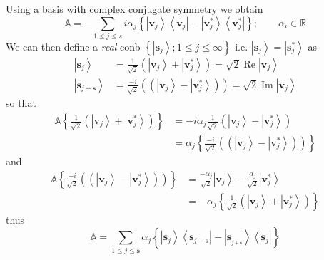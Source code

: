 \documentclass[aps,preprint]{revtex4}%
\begin{document}
Using a basis with complex conjugate symmetry we obtain
\begin{equation}
\mathbb{A}=-\sum_{1\leq j\leq s}i\alpha_{j}\left\{  \left\vert \mathbf{v}%
_{j}\right\rangle \left\langle \mathbf{v}_{j}\right\vert -\left\vert
\mathbf{v}_{j}^{\ast}\right\rangle \left\langle \mathbf{v}_{j}^{\ast
}\right\vert \right\}  ;\qquad\alpha_{i}\in\mathbb{R}%
\end{equation}
We can then define a \emph{real} conb $\left\{  \left\vert \mathbf{s}%
_{j}\right\rangle ;1\leq j\leq\infty\right\}  $ i.e. $\left\vert
\mathbf{s}_{j}\right\rangle =\left\vert \mathbf{s}_{j}^{\ast}\right\rangle $
as
\begin{align}
\left\vert \mathbf{s}_{j}\right\rangle  &  =\frac{1}{\sqrt{2}}\left(
\left\vert \mathbf{v}_{j}\right\rangle +\left\vert \mathbf{v}_{j}^{\ast
}\right\rangle \right)  =\sqrt{2}\operatorname{Re}\left\vert \mathbf{v}%
_{j}\right\rangle \nonumber\\
\left\vert \mathbf{s}_{j+\mathbf{s}}\right\rangle  &  =\frac{-i}{\sqrt{2}%
}\left(  \left(  \left\vert \mathbf{v}_{j}\right\rangle -\left\vert
\mathbf{v}_{j}^{\ast}\right\rangle \right)  \right)  =\sqrt{2}%
\operatorname{Im}\left\vert \mathbf{v}_{j}\right\rangle
\end{align}
so that
\begin{align}
\mathbb{A}\left\{  \frac{1}{\sqrt{2}}\left(  \left\vert \mathbf{v}%
_{j}\right\rangle +\left\vert \mathbf{v}_{j}^{\ast}\right\rangle \right)
\right\}   &  =-i\alpha_{j}\frac{1}{\sqrt{2}}\left(  \left\vert \mathbf{v}%
_{j}\right\rangle -\left\vert \mathbf{v}_{j}^{\ast}\right\rangle \right)
\nonumber\\
&  =\alpha_{j}\left\{  \frac{-i}{\sqrt{2}}\left(  \left(  \left\vert
\mathbf{v}_{j}\right\rangle -\left\vert \mathbf{v}_{j}^{\ast}\right\rangle
\right)  \right)  \right\}
\end{align}
and
\begin{align}
\mathbb{A}\left\{  \frac{-i}{\sqrt{2}}\left(  \left(  \left\vert
\mathbf{v}_{j}\right\rangle -\left\vert \mathbf{v}_{j}^{\ast}\right\rangle
\right)  \right)  \right\}   &  =\frac{-\alpha_{j}}{\sqrt{2}}\left\vert
\mathbf{v}_{j}\right\rangle -\frac{\alpha_{j}}{\sqrt{2}}\left\vert
\mathbf{v}_{j}^{\ast}\right\rangle \nonumber\\
&  =-\alpha_{j}\left\{  \frac{1}{\sqrt{2}}\left(  \left\vert \mathbf{v}%
_{j}\right\rangle +\left\vert \mathbf{v}_{j}^{\ast}\right\rangle \right)
\right\}
\end{align}
thus
\begin{equation}
\mathbb{A=}\sum_{1\leq j\leq\mathbf{s}}\alpha_{j}\left\{  \left\vert
\mathbf{s}_{j}\right\rangle \left\langle \mathbf{s}_{j+\mathbf{s}}\right\vert
-\left\vert \mathbf{s}_{_{j+\mathbf{s}}}\right\rangle \left\langle
\mathbf{s}_{j}\right\vert \right\}
\end{equation}
\end{document}

